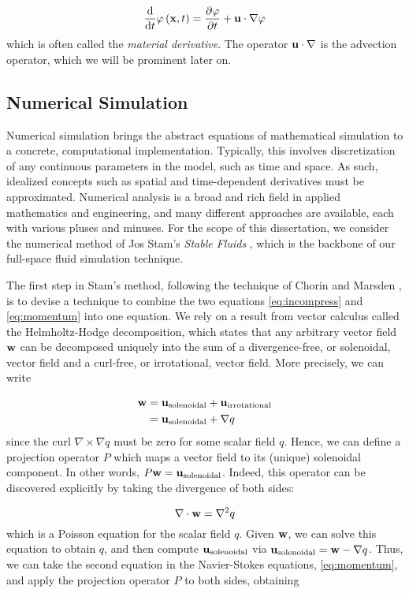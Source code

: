 \begin{equation}
\frac{\mathrm{d}}{\mathrm{d}t}\varphi\left(\mathbf{x}, t\right) = \frac{\partial \varphi}{\partial t} + \mathbf{u} \cdot \nabla \varphi
\end{equation}
which is often called the {\em material derivative}. The operator $\mathbf{u} \cdot \nabla$ is the advection operator, which we will be prominent later on.

\subsection{Numerical Simulation}
Numerical simulation brings the abstract equations of mathematical simulation to a concrete, computational implementation. Typically, this involves discretization of any continuous parameters in the model, such as time and 
space. As such, idealized concepts such as spatial and time-dependent derivatives must be approximated. Numerical analysis is a broad and rich field in applied mathematics and engineering, and many different approaches
are available, each with various pluses and minuses. For the scope of this dissertation, we consider the numerical method of Jos Stam's {\em Stable Fluids} \cite{Stam99}, which is the backbone of our full-space fluid simulation technique. 

The first step in Stam's method, following the technique of Chorin and Marsden , is to devise a technique to combine the two equations \ref{eq:incompress} and \ref{eq:momentum} into one equation. We rely on a result from vector calculus called the Helmholtz-Hodge decomposition, which states that any arbitrary vector field $\mathbf{w}$ can be decomposed uniquely into the sum of a divergence-free, or solenoidal, vector field and a curl-free, or irrotational, vector field. More precisely,
we can write

\begin{align}
\label{eq:hh}
\mathbf{w} &= \mathbf{u}_{\text{solenoidal}} + \mathbf{u}_{\text{irrotational}}\\
        &= \mathbf{u}_{\text{solenoidal}} + \nabla q
\end{align}
since the curl $\nabla \times \nabla q$ must be zero for some scalar field $q$. Hence, we can define a projection operator $P$ which maps a vector field to its (unique) solenoidal component. In other words,
$P \mathbf{w} = \mathbf{u}_{\text{solenoidal}}$. Indeed, this operator can be discovered explicitly by taking the divergence of both sides:

\begin{equation}
\nabla \cdot \mathbf{w} = \nabla^2 q
\end{equation}
which is a Poisson equation for the scalar field $q$. Given $\mathbf{w}$, we can solve this equation to obtain $q$, and then compute $\mathbf{u}_{\text{solenoidal}}$ via $\mathbf{u}_{\text{solenoidal}} = \mathbf{w} - \nabla q$. Thus, we can take the
second equation in the Navier-Stokes equations, \ref{eq:momentum}, and apply the projection operator $P$ to both sides, obtaining

